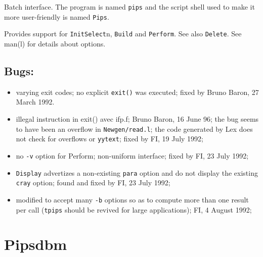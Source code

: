 Batch interface. The program is named \verb+pips+ and the script shell
used to make it more user-friendly is named \verb+Pips+.

Provides support for \verb+Init+\verb+Select+n, \verb+Build+ and
\verb+Perform+. See also \verb+Delete+. See man(l) for details about options.

\subsection{Bugs:}

\begin{itemize}

  \item varying exit codes; no explicit \verb+exit()+ was executed;
        fixed by Bruno Baron, 27 March 1992.

  \item illegal instruction in exit() avec ifp.f; Bruno Baron, 16 June 96;
        the bug seems to have been an overflow in \verb+Newgen/read.l+;
        the code generated by Lex does not check for overflows or
        \verb=yytext=;
        fixed by FI, 19 July 1992;

  \item no \verb+-v+ option for Perform; non-uniform interface;
        fixed by FI, 23 July 1992;

  \item \verb+Display+ advertizes a non-existing \verb+para+ option
        and do not display the existing \verb+cray+ option;
        found and fixed by FI, 23 July 1992;

  \item modified to accept many \verb+-b+ options so as to compute
        more than one result per call (\verb+tpips+ should be revived
        for large applications); FI, 4 August 1992;

\end{itemize}

\section{Pipsdbm}

